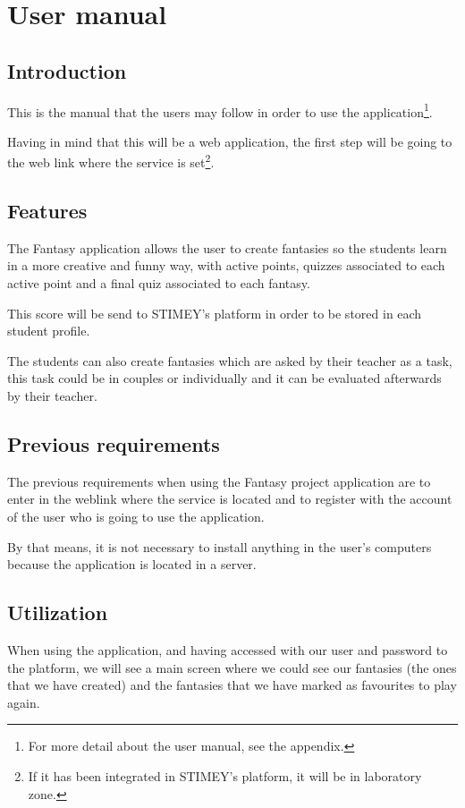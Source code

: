 \chapter{User manual}
\section{Introduction}
This is the manual that the users may follow in order to use the application\footnote{For more detail about the user manual, see the appendix.}.

Having in mind that this will be a web application, the first step will be going to the web link where the service is set\footnote{If it has been integrated in STIMEY's platform, it will be in laboratory zone.}.

\section{Features}
The Fantasy application allows the user to create fantasies so the students learn in a more creative and funny way, with active points, quizzes associated to each active point and a final quiz associated to each fantasy.

This score will be send to STIMEY's platform in order to be stored in each student profile. 

The students can also create fantasies which are asked by their teacher as a task, this task could be in couples or individually and it can be evaluated afterwards by their teacher.

\section{Previous requirements}
The previous requirements when using the Fantasy project application are to enter in the weblink where the service is located and to register with the account of the user who is going to use the application.

By that means, it is not necessary to install anything in the user's computers because the application is located in a server.

\section{Utilization}
When using the application, and having accessed with our user and password to the platform, we will see a main screen where we could see our fantasies (the ones that we have created) and the fantasies that we have marked as favourites to play again.

